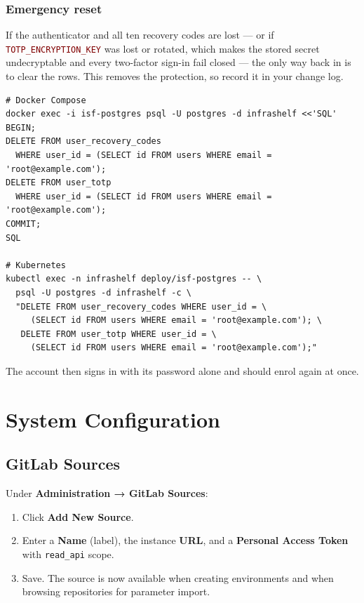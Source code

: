 \documentclass[12pt,a4paper,twoside]{report}
\newcommand{\code}[1]{\texttt{#1}}
\newcommand{\env}[1]{\texttt{\textcolor{Maroon}{#1}}}
\begin{document}
\subsection*{Emergency reset}

If the authenticator and all ten recovery codes are lost — or if
\env{TOTP\_ENCRYPTION\_KEY} was lost or rotated, which makes the stored secret
undecryptable and every two-factor sign-in fail closed — the only way back in is
to clear the rows. This removes the protection, so record it in your change log.

\begin{lstlisting}[style=bash]
# Docker Compose
docker exec -i isf-postgres psql -U postgres -d infrashelf <<'SQL'
BEGIN;
DELETE FROM user_recovery_codes
  WHERE user_id = (SELECT id FROM users WHERE email = 'root@example.com');
DELETE FROM user_totp
  WHERE user_id = (SELECT id FROM users WHERE email = 'root@example.com');
COMMIT;
SQL

# Kubernetes
kubectl exec -n infrashelf deploy/isf-postgres -- \
  psql -U postgres -d infrashelf -c \
  "DELETE FROM user_recovery_codes WHERE user_id = \
     (SELECT id FROM users WHERE email = 'root@example.com'); \
   DELETE FROM user_totp WHERE user_id = \
     (SELECT id FROM users WHERE email = 'root@example.com');"
\end{lstlisting}

The account then signs in with its password alone and should enrol again at once.

\chapter{System Configuration}
\label{ch:sysconfig}

\section{GitLab Sources}

Under \textbf{Administration → GitLab Sources}:

\begin{enumerate}
  \item Click \textbf{Add New Source}.
  \item Enter a \textbf{Name} (label), the instance \textbf{URL}, and
        a \textbf{Personal Access Token} with \code{read\_api} scope.
  \item Save. The source is now available when creating environments and
        when browsing repositories for parameter import.
\end{enumerate}
\end{document}
